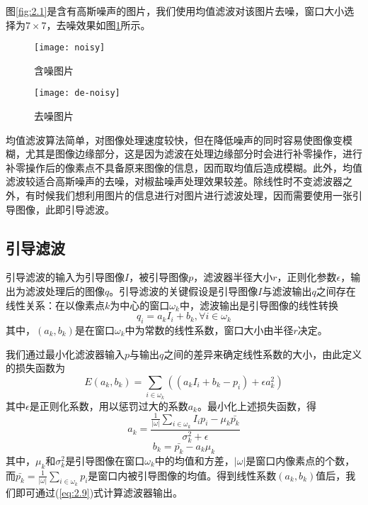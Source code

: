 \documentclass[a4paper, 12pt, oneside]{report}
\begin{document}
{图\ref{fig:2.1}是含有高斯噪声的图片，我们使用均值滤波对该图片去噪，窗口大小选择为$7\times 7$，去噪效果如图\ref{fig:2.2}所示。
\begin{figure}[htbp]
\centering
\begin{minipage}[t]{0.48\textwidth}
\centering
\texttt{[image: noisy]}
\caption{含噪图片}
\label{fig:2.1}
\end{minipage}\quad
\begin{minipage}[t]{0.48\textwidth}
\centering
\texttt{[image: de-noisy]}
\caption{去噪图片}
\label{fig:2.2}
\end{minipage}
\end{figure}

均值滤波算法简单，对图像处理速度较快，但在降低噪声的同时容易使图像变模糊，尤其是图像边缘部分，这是因为滤波在处理边缘部分时会进行补零操作，进行补零操作后的像素点不具备原来图像的信息，因而取均值后造成模糊。此外，均值滤波较适合高斯噪声的去噪，对椒盐噪声处理效果较差。除线性时不变滤波器之外，有时候我们想利用图片的信息进行对图片进行滤波处理，因而需要使用一张引导图像，此即引导滤波。
\subsection{引导滤波\quad}
引导滤波的输入为引导图像$I$，被引导图像$p$，滤波器半径大小$r$，正则化参数$\epsilon$，输出为滤波处理后的图像$q$。引导滤波的关键假设是引导图像$I$与滤波输出$q$之间存在线性关系：在以像素点$k$为中心的窗口$\omega_k$中，滤波输出是引导图像的线性转换
\begin{equation} \label{eq:2.9}
q_i = a_k I_i + b_k, \forall i \in \omega_k
\end{equation}
其中，$(a_k, b_k)$是在窗口$\omega_k$中为常数的线性系数，窗口大小由半径$r$决定。

我们通过最小化滤波器输入$p$与输出$q$之间的差异来确定线性系数的大小，由此定义的损失函数为
\begin{equation} \label{eq:2.10}
E(a_k, b_k) = \sum_{i\in \omega_k}((a_k I_i + b_k - p_i) + \epsilon a_k^2)
\end{equation}
其中$\epsilon$是正则化系数，用以惩罚过大的系数$a_k$。最小化上述损失函数，得
\begin{equation} \label{eq:2.11}
a_k = \frac{\frac{1}{|\omega|}\sum_{i\in \omega_k}I_ip_i - \mu_k\bar{p_k}}{\sigma_k^2 + \epsilon}
\end{equation}
\begin{equation} \label{eq:2.12}
b_k = \bar{p_k} - a_k \mu_k
\end{equation}
其中，$\mu_k$和$\sigma_k^2$是引导图像在窗口$\omega_k$中的均值和方差，$|\omega|$是窗口内像素点的个数，而$\bar{p_k} = \frac{1}{|\omega|}\sum_{i\in \omega_k}p_i$是窗口内被引导图像的均值。得到线性系数$(a_k, b_k)$值后，我们即可通过(\ref{eq:2.9})式计算滤波器输出。

}
\end{document}
